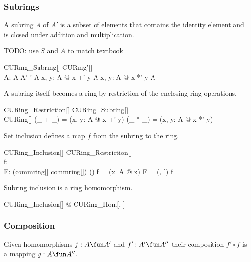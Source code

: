 \documentclass{amsart}
\begin{document}
\subsubsection{Subrings}

A subring $A$ of $A'$ is a subset of elements that contains the identity element and is closed under
addition and multiplication.

TODO: use $S$ and $A$ to match textbook

\begin{schema}{CURing\_Subring}[\genT]
	CURing'[\genT] \\
	A: \power \genT
\where
	A \subseteq A'
\also
	\oneG' \in A
\also
	\forall x, y: A @ x +' y \in A
\also
	\forall x, y: A @ x *' y \in A	
\end{schema}

A subring itself becomes a ring by restriction of the enclosing ring operations.

\begin{schema}{CURing\_Restriction}[\genT]
	CURing\_Subring[\genT] \\
	CURing[\genT]
\where
	(\_ + \_) = (\lambda x, y: A @ x +' y)
\also
	(\_ * \_) = (\lambda x, y: A @ x *' y)
\end{schema}

Set inclusion defines a map $f$ from the subring to the ring.

\begin{schema}{CURing\_Inclusion}[\genT]
	CURing\_Restriction[\genT] \\
	f: \genT \pfun \genT \\
	F: (commring[\genT] \cross commring[\genT]) \cross (\genT \pfun \genT)
\where
	f = (\lambda x: A @ x)
\also
	F = (\strucA, \strucA') \mapsto f
\end{schema}

\begin{remark}
Subring inclusion is a ring homomorphism.

\begin{zed}
\forall CURing\_Inclusion[\setT] @ CURing\_Hom[\setT, \setT]
\end{zed}

\end{remark}

\subsubsection{Composition}

Given homomorphisms $f : A \fun A'$ and $f': A' \fun A''$ their composition 
$f' \circ f$ is a mapping $g: A \fun A''$.
\end{document}
